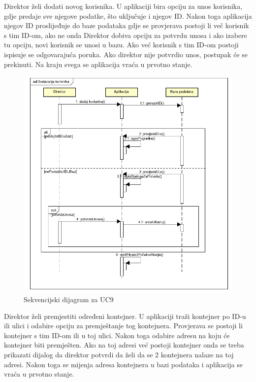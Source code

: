 			
			\noindent	Direktor želi dodati novog korisnika. U aplikaciji bira opciju za unos korisnika, gdje predaje sve njegove podatke, što uključuje i njegov ID. Nakon toga aplikacija njegov ID proslijeđuje do baze podataka gdje se provjerava postoji li več korisnik s tim ID-om, ako ne onda Direktor dobiva opciju za potvrdu unosa i ako izabere tu opciju, novi korisnik se unosi u bazu. Ako već korisnik s tim ID-om postoji ispisuje se odgovarajuća poruka. Ako direktor nije potvrdio unos, postupak će se prekinuti. Na kraju svega se aplikacija vraća u prvotno stanje.
			
			\begin{figure}
				\centering
				\includegraphics[width=1.0\linewidth]{"slike/Sekvencijski dijagram za dodavanje korisnika"}
				\caption{Sekvencijski dijagram za UC9}
				\label{fig:sekvencijski-dijagram-za-dodavanje-korisnika}
			\end{figure}
			
			\clearpage	 
			
			
			\noindent
			Direktor želi premjestiti određeni kontejner. U aplikaciji traži kontejner po ID-u ili ulici i odabire opciju za premještanje tog kontejnera. Provjerava se postoji li kontejner s tim ID-om ili u toj ulici. Nakon toga odabire adresu na koju će kontejner biti premješten. Ako na toj adresi već postoji kontejner onda se treba prikazati dijalog da direktor potvrdi da želi da se 2 kontejnera nalaze na toj adresi. Nakon toga se mijenja adresa kontejnera u bazi podataka i aplikacija se vraća u prvotno stanje.
			
